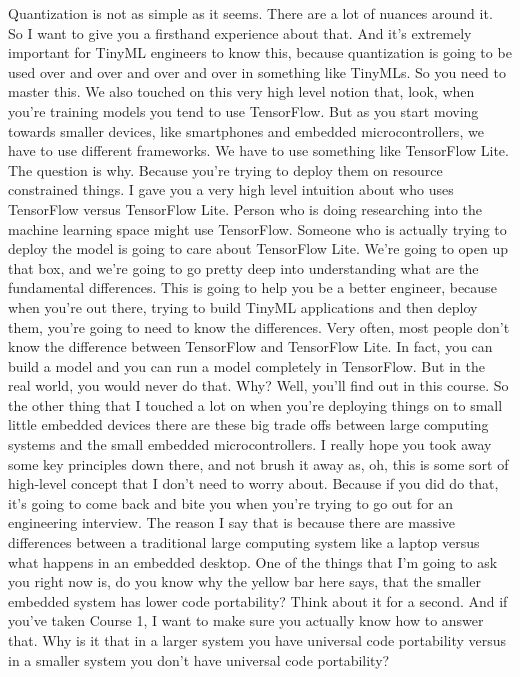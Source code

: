 Quantization is not as simple as it seems.
There are a lot of nuances around it.
So I want to give you a firsthand experience about that.
And it's extremely important for TinyML engineers to know this,
because quantization is going to be used over and over
and over and over in something like TinyMLs.
So you need to master this.
We also touched on this very high level notion
that, look, when you're training models you tend to use TensorFlow.
But as you start moving towards smaller devices, like smartphones and embedded
microcontrollers, we have to use different frameworks.
We have to use something like TensorFlow Lite.
The question is why.
Because you're trying to deploy them on resource constrained things.
I gave you a very high level intuition about who
uses TensorFlow versus TensorFlow Lite.
Person who is doing researching into the machine learning space
might use TensorFlow.
Someone who is actually trying to deploy the model
is going to care about TensorFlow Lite.
We're going to open up that box, and we're
going to go pretty deep into understanding
what are the fundamental differences.
This is going to help you be a better engineer,
because when you're out there, trying to build TinyML applications
and then deploy them, you're going to need to know the differences.
Very often, most people don't know the difference
between TensorFlow and TensorFlow Lite.
In fact, you can build a model and you can run a model completely
in TensorFlow.
But in the real world, you would never do that.
Why?
Well, you'll find out in this course.
So the other thing that I touched a lot on when you're deploying things
on to small little embedded devices there
are these big trade offs between large computing
systems and the small embedded microcontrollers.
I really hope you took away some key principles down there,
and not brush it away as, oh, this is some sort of high-level concept
that I don't need to worry about.
Because if you did do that, it's going to come back and bite you
when you're trying to go out for an engineering interview.
The reason I say that is because there are
massive differences between a traditional large computing
system like a laptop versus what happens in an embedded desktop.
One of the things that I'm going to ask you right now
is, do you know why the yellow bar here says, that the smaller embedded
system has lower code portability?
Think about it for a second.
And if you've taken Course 1, I want to make sure you actually
know how to answer that.
Why is it that in a larger system you have universal code portability
versus in a smaller system you don't have universal code portability?
